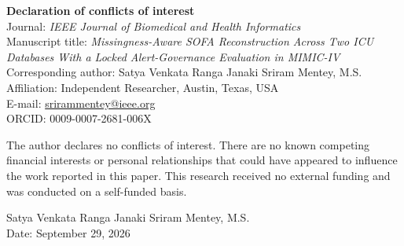 \documentclass[11pt]{article}
\begin{document}
\noindent\textbf{Declaration of conflicts of interest}\\[0.8em]
Journal: \textit{IEEE Journal of Biomedical and Health Informatics}\\
Manuscript title: \textit{Missingness-Aware SOFA Reconstruction Across Two ICU
Databases With a Locked Alert-Governance Evaluation in MIMIC-IV}\\[0.6em]
Corresponding author: Satya Venkata Ranga Janaki Sriram Mentey, M.S.\\
Affiliation: Independent Researcher, Austin, Texas, USA\\
E-mail: \href{mailto:srirammentey@ieee.org}{srirammentey@ieee.org}\\
ORCID: 0009-0007-2681-006X

\vspace{1em}
The author declares no conflicts of interest. There are no known competing
financial interests or personal relationships that could have appeared to
influence the work reported in this paper. This research received no external
funding and was conducted on a self-funded basis.

\vspace{1.5em}
\noindent Satya Venkata Ranga Janaki Sriram Mentey, M.S.\\
Date: September 29, 2026
\end{document}
